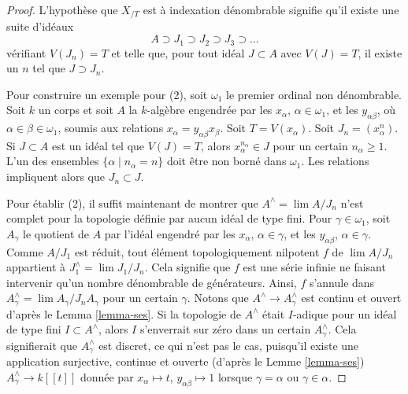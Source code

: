 \begin{proof}
L'hypothèse que $X_{/T}$ est à indexation dénombrable signifie qu'il existe une
suite d'idéaux
$$
A \supset J_1 \supset J_2 \supset J_3 \supset \ldots
$$
vérifiant $V(J_n) = T$ et telle que, pour tout idéal $J \subset A$ avec $V(J) = T$,
il existe un $n$ tel que $J \supset J_n$.

\medskip\noindent
Pour construire un exemple pour (2), soit $\omega_1$ le premier ordinal non
dénombrable. Soit $k$ un corps et soit
$A$ la $k$-algèbre engendrée par les $x_\alpha$, $\alpha \in \omega_1$,
et les $y_{\alpha \beta}$, où $\alpha \in \beta \in \omega_1$,
soumis aux relations $x_\alpha = y_{\alpha \beta} x_\beta$.
Soit $T = V(x_\alpha)$. Soit $J_n = (x_\alpha^n)$.
Si $J \subset A$ est un idéal tel que
$V(J) = T$, alors $x_\alpha^{n_\alpha} \in J$ pour un certain $n_\alpha \geq 1$.
L'un des ensembles $\{\alpha \mid n_\alpha = n\}$ doit être non borné dans
$\omega_1$. Les relations impliquent alors que $J_n \subset J$.

\medskip\noindent
Pour établir (2), il suffit maintenant de montrer que $A^\wedge = \lim A/J_n$
n'est complet pour la topologie définie par aucun idéal de type fini.
Pour $\gamma \in \omega_1$, soit $A_\gamma$ le quotient de $A$
par l'idéal engendré par les $x_\alpha$, $\alpha \in \gamma$, et les
$y_{\alpha \beta}$, $\alpha \in \gamma$. Comme $A/J_1$ est réduit,
tout élément topologiquement nilpotent $f$ de $\lim A/J_n$ appartient à
$J_1^\wedge = \lim J_1/J_n$. Cela signifie que $f$ est une série infinie
ne faisant intervenir qu'un nombre dénombrable de générateurs. Ainsi, $f$ s'annule dans
$A_\gamma^\wedge = \lim A_\gamma/J_nA_\gamma$ pour un certain $\gamma$.
Notons que $A^\wedge \to A_\gamma^\wedge$ est continu et ouvert d'après le
Lemma \ref{lemma-ses}.
Si la topologie de $A^\wedge$ était $I$-adique pour un idéal de type fini
$I \subset A^\wedge$, alors $I$ s'enverrait sur zéro dans un certain
$A_\gamma^\wedge$. Cela signifierait que $A_\gamma^\wedge$ est discret,
ce qui n'est pas le cas, puisqu'il existe une application surjective, continue et ouverte
(d'après le Lemme \ref{lemma-ses})
$A_\gamma^\wedge \to k[[t]]$ donnée par
$x_\alpha \mapsto t$, $y_{\alpha \beta} \mapsto 1$ lorsque
$\gamma = \alpha$ ou $\gamma \in \alpha$.


\end{proof}
